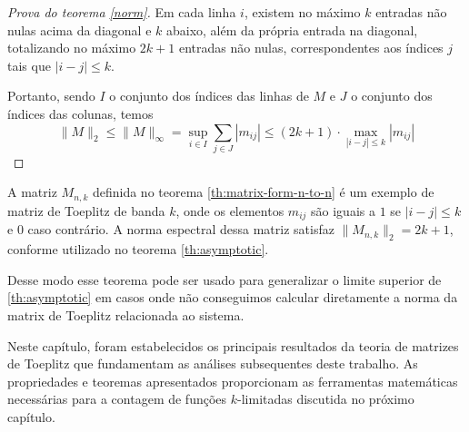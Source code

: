 \begin{proof}[Prova do teorema \ref{norm}]
  Em cada linha $i$, existem no máximo $k$ entradas não nulas acima da diagonal e $k$ abaixo, além da própria entrada na diagonal, totalizando no máximo $2k + 1$ entradas não nulas, correspondentes aos índices $j$ tais que $\lvert i - j \rvert \leq k$.

  Portanto, sendo $I$ o conjunto dos índices das linhas de $M$ e $J$ o conjunto dos índices das colunas, temos \[ \| M \|_2 \le \| M \|_\infty = \sup_{i \in I} \sum_{j \in J} |m_{ij}| \leq (2k + 1) \cdot \max_{|i - j| \leq k} |m_{ij}| \]
\end{proof}

A matriz $ M_{n,k} $ definida no teorema \ref{th:matrix-form-n-to-n} é um exemplo de matriz de Toeplitz de banda $ k $, onde os elementos $ m_{ij} $ são iguais a $ 1 $ se $ |i - j| \le k $ e $ 0 $ caso contrário. A norma espectral dessa matriz satisfaz $ \| M_{n,k} \|_2 = 2k + 1 $, conforme utilizado no teorema \ref{th:asymptotic}.

Desse modo esse teorema pode ser usado para generalizar o limite superior de \ref{th:asymptotic} em casos onde não conseguimos calcular diretamente a norma da matrix de Toeplitz relacionada ao sistema.

Neste capítulo, foram estabelecidos os principais resultados da teoria de matrizes de Toeplitz que fundamentam as análises subsequentes deste trabalho. As propriedades e teoremas apresentados proporcionam as ferramentas matemáticas necessárias para a contagem de funções $k$-limitadas discutida no próximo capítulo.
